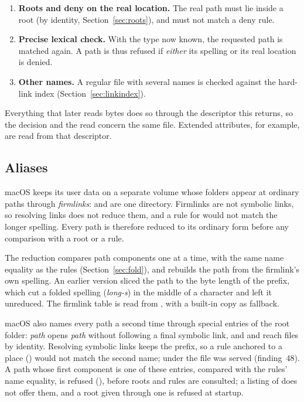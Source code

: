 \begin{enumerate}
        \emph{same file} as the open descriptor (device and inode).  If not, the path
        changed between the two steps and the request is refused as a race.
  \item \textbf{Roots and deny on the real location.}  The real path must lie inside a
        root (by identity, Section~\ref{sec:roots}), and must not match a deny rule.
  \item \textbf{Precise lexical check.}  With the type now known, the requested path is
        matched again.  A path is thus refused if \emph{either} its spelling or its real
        location is denied.
  \item \textbf{Other names.}  A regular file with several names is checked against
        the hard-link index (Section~\ref{sec:linkindex}).
\end{enumerate}

Everything that later reads bytes does so through the descriptor this returns, so
the decision and the read concern the same file.  Extended attributes, for example,
are read from that descriptor.

\subsection{Aliases}
\label{sec:aliases}

macOS keeps its user data on a separate volume whose folders appear at ordinary
paths through \emph{firmlinks}:  and 
are one directory.  Firmlinks are not symbolic links, so resolving links does not
reduce them, and a rule for  would not match the longer
spelling.  Every path is therefore reduced to its ordinary form before any comparison
with a root or a rule.

The reduction compares path components one at a time, with the same name equality as
the rules (Section~\ref{sec:fold}), and rebuilds the path from the firmlink's own
spelling.  An earlier version sliced the path to the byte length of the prefix, which
cut a folded spelling (\emph{long-s}) in the middle of a
character and left it unreduced.  The firmlink table is read from
, with a built-in copy as fallback.

macOS also names every path a second time through special entries of the root folder:
\emph{path} opens \emph{path} without following a final symbolic link,
and  and  reach files by identity.  Resolving symbolic links
keeps the  prefix, so a rule anchored to a place ()
would not match the second name; under  the file was served (finding~48).
A path whose first component is one of these entries, compared with the rules' name
equality, is refused (), before roots and rules are consulted;
a listing of \code{/} does not offer them, and a root given through one is refused at
startup.

